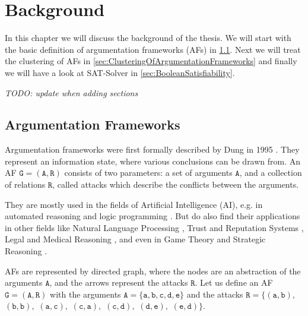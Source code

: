 \chapter{Background}
\label{ch:Background}
In this chapter we will discuss the background of the thesis. We will start with the basic definition of argumentation frameworks (AFs) in \cref{sec:ArgumentationFrameworks}. Next we will treat the clustering of AFs in \cref{sec:ClusteringOfArgumentationFrameworks} and finally we will have a look at SAT-Solver in \cref{sec:BooleanSatisfiability}.

\textit{TODO: update when adding sections}


\section{Argumentation Frameworks}
\label{sec:ArgumentationFrameworks}

Argumentation frameworks were first formally described by Dung in 1995 \cite{DUNG1995321}. They represent an information state, where various conclusions can be drawn from. An AF $\mathtt{G = (A, R)}$ consists of two parameters: a set of arguments $\mathtt{A}$, and a collection of relations $\mathtt{R}$, called attacks which describe the conflicts between the arguments.

They are mostly used in the fields of Artificial Intelligence (AI), e.g. in automated reasoning and logic programming \cite{AFINAIARLP, AFINAIARLPexample}. But do also find their applications in other fields like Natural Language Processing \cite{AFINNLP}, Trust and Reputation Systems \cite{AFINTaRS}, Legal and Medical Reasoning \cite{legalAndMedicalReasoning}, and even in Game Theory and Strategic Reasoning \cite{AFinGames}.

AFs are represented by directed graph, where the nodes are an abstraction of the arguments $\mathtt{A}$, and the arrows represent the attacks $\mathtt{R}$. Let us define an AF $\mathtt{G = (A, R)}$ with the arguments
$\mathtt{A=\{a, b, c, d, e\}}$ and the attacks
$\mathtt{R=\{(a,b),}$
$\mathtt{(b,b),}$
$\mathtt{(a,c),}$
$\mathtt{(c,a),}$
$\mathtt{(c,d),}$
$\mathtt{(d,e),}$
$\mathtt{(e,d)\}}.$


